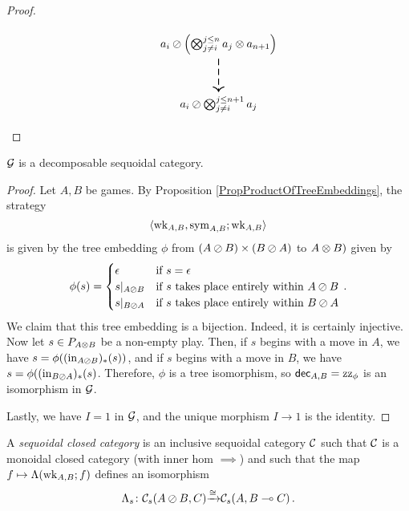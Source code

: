 \documentclass[11pt]{report}
\begin{document}
\begin{proof}
\begin{SidewaysFigure}
\[\begin{tikzcd}[ampersand replacement=\&, column sep=6pt, row sep=30pt]
          \&
            \&
              \& |[alias=Y]| a_i \sequoid \left(\Tensor_{j\ne i}^{j\le n} a_j \tensor a_{n+1}\right) \arrow[d, thick, dashed] \\
          \&
            \&
              \& a_i \sequoid \Tensor_{j\ne i}^{j\le n+1}a_j
      \end{tikzcd}
      \]
    \caption[Diagram used in the proof of Proposition \ref{PropDecSeqFormula}]{Diagram used in the proof of Proposition \ref{PropDecSeqFormula}.  
    The pentagon at the heart of the diagram is the coherence diagram for $\passoc$ and $\wk$ from Definition \ref{DefSequoidalCategory}.}
    \label{FigDecSeqFormula}
  \end{SidewaysFigure}
\end{proof}

\begin{proposition}
  $\mathcal G$ is a decomposable sequoidal category.
\end{proposition}
\begin{proof}
  Let $A,B$ be games.  
  By Proposition \ref{PropProductOfTreeEmbeddings}, the strategy 
  \[
    \langle \operatorname{wk}_{A,B},\operatorname{sym}_{A,B};\operatorname{wk}_{A,B}\rangle
    \]
  is given by the tree embedding $\phi$ from $(A \oslash B) \times (B \oslash A)$ to $A \otimes B)$ given by
  \[
    \phi(s) = \begin{cases}
      \epsilon & \text{if $s=\epsilon$} \\
      s\vert_{A \oslash B} & \text{if $s$ takes place entirely within $A\oslash B$} \\
      s\vert_{B \oslash A} & \text{if $s$ takes place entirely within $B\oslash A$}
    \end{cases}\,.
    \]
  We claim that this tree embedding is a bijection.  
  Indeed, it is certainly injective.
  Now let $s\in P_{A\otimes B}$ be a non-empty play.  
  Then, if $s$ begins with a move in $A$, we have $s=\phi((\operatorname{in}_{A\oslash B})_*(s))$, and if $s$ begins with a move in $B$, we have $s=\phi((\operatorname{in}_{B\oslash A})_*(s)$.  
  Therefore, $\phi$ is a tree isomorphism, so $\operatorname{{\mathsf{dec}}}_{A,B}=\operatorname{zz}_\phi$ is an isomorphism in $\mathcal G$.

  Lastly, we have $I=1$ in $\mathcal G$, and the unique morphism $I\to 1$ is the identity.
\end{proof}

\begin{definition}
  A \emph{sequoidal closed category} is an inclusive sequoidal category ${\mathcal{C}}$ such that ${\mathcal{C}}$ is a monoidal closed category (with inner hom $\implies$) and such that the map $f\mapsto \Lambda(\operatorname{wk}_{A,B};f)$ defines an isomorphism
  \[
    \Lambda_s \colon {\mathcal{C}}_s(A \oslash B,C) {\xrightarrow{\cong}} {\mathcal{C}}_s(A,B\multimap C)\,.
    \]
\end{definition}
\end{document}
